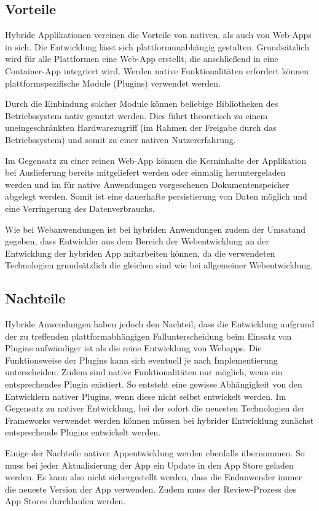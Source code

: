 \subsection{Vorteile}
%
Hybride Applikationen vereinen die Vorteile von nativen, als auch von Web-Apps in sich. Die Entwicklung lässt sich plattformunabhängig gestalten. Grundsätzlich wird für alle Plattformen eine Web-App erstellt, die anschließend in eine Container-App integriert wird. Werden native Funktionalitäten erfordert können plattformspezifische Module (Plugins) verwendet werden.

Durch die Einbindung solcher Module können beliebige Bibliotheken des Betriebssystem nativ genutzt werden. Dies führt theoretisch zu einem uneingeschränkten Hardwarezugriff (im Rahmen der Freigabe durch das Betriebssystem) und somit zu einer nativen Nutzererfahrung. 

Im Gegensatz zu einer reinen Web-App können die Kerninhalte der Applikation bei Auslieferung bereits mitgeliefert werden oder einmalig heruntergeladen werden und im für native Anwendungen vorgesehenen Dokumentenspeicher abgelegt werden. Somit ist eine dauerhafte persistierung von Daten möglich und eine Verringerung des Datenverbrauchs.

Wie bei Webanwendungen ist bei hybriden Anwendungen zudem der Umsatand gegeben, dass Entwickler aus dem Bereich der Webentwicklung an der Entwicklung der hybriden App mitarbeiten können, da die verwendeten Technologien grundsätzlich die gleichen sind wie bei allgemeiner Webentwicklung. 
%
\subsection{Nachteile}
%
Hybride Anwendungen haben jedoch den Nachteil, dass die Entwicklung aufgrund der zu treffenden plattformabhängigen Fallunterscheidung beim Einsatz von Plugins aufwändiger ist als die reine Entwicklung von Webapps. Die Funktionsweise der Plugins kann sich eventuell je nach Implementierung unterscheiden. Zudem sind native Funktionalitäten nur möglich, wenn ein entsprechendes Plugin existiert. So entsteht eine gewisse Abhängigkeit von den Entwicklern nativer Plugins, wenn diese nicht selbst entwickelt werden. Im Gegensatz zu nativer Entwicklung, bei der sofort die neuesten Technologien der Frameworks verwendet werden können müssen bei hybrider Entwicklung zunächst entsprechende Plugins entwickelt werden.

Einige der Nachteile nativer Appentwicklung werden ebenfalls übernommen. So muss bei jeder Aktualisierung der App ein Update in den App Store geladen werden. Es kann also nicht sichergestellt werden, dass die Endanwender immer die neueste Version der App verwenden. Zudem muss der Review-Prozess des App Stores durchlaufen werden. 
